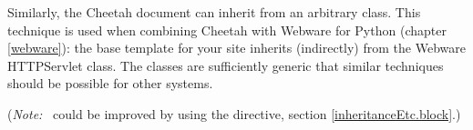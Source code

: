 Similarly, the Cheetah document can inherit from an arbitrary class. This
technique is used when combining Cheetah with Webware for Python
(chapter \ref{webware}): the base template for your site inherits (indirectly)
from the Webware HTTPServlet class.  The classes are sufficiently generic that
similar techniques should be possible for other systems.

({\em Note:}\  could be improved by using the
 directive, section \ref{inheritanceEtc.block}.)


